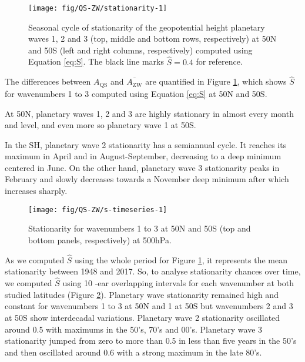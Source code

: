 \documentclass[draft,linenumbers]{agujournal2018}
\begin{document}
\begin{figure}[h]

{\centering \texttt{[image: fig/QS-ZW/stationarity-1]} 

}

\caption{Seasonal cycle of stationarity of the geopotential height planetary waves 1, 2 and 3 (top, middle and bottom rows, respectively) at 50\degree N and 50\degree S (left and right columns, respectively) computed using Equation \ref{eq:S}. The black line marks $\hat{S} = 0.4$ for reference.}\label{fig:stationarity}
\end{figure}

The differences between \(A_\mathrm{QS}\) and
\(\overline{A_\mathrm{ZW}}\) are quantified in Figure
\ref{fig:stationarity}, which shows \(\hat{S}\) for wavenumbers 1 to 3
computed using Equation \ref{eq:S} at 50\degree N and 50\degree S.

At 50\degree N, planetary waves 1, 2 and 3 are highly stationary in
almost every month and level, and even more so planetary wave 1 at
50\degree S.

In the SH, planetary wave 2 stationarity has a semiannual cycle. It
reaches its maximum in April and in August-September, decreasing to a
deep minimum centered in June. On the other hand, planetary wave 3
stationarity peaks in February and slowly decreases towards a November
deep minimum after which increases sharply.

\begin{figure}[h]

{\centering \texttt{[image: fig/QS-ZW/s-timeseries-1]} 

}

\caption{Stationarity for wavenumbers 1 to 3 at 50\degree N and  50\degree S (top and bottom panels, respectively) at 500hPa.}\label{fig:s-timeseries}
\end{figure}

As we computed \(\hat{S}\) using the whole period for Figure
\ref{fig:stationarity}, it represents the mean stationarity between 1948
and 2017. So, to analyse stationarity chances over time, we computed
\(\hat{S}\) using 10 -ear overlapping intervals for each wavenumber at
both studied latitudes (Figure \ref{fig:s-timeseries}). Planetary wave
stationarity remained high and constant for wavenumbers 1 to 3 at
50\degree N and 1 at 50\degree S but wavenumbers 2 and 3 at 50\degree S
show interdecadal variations. Planetary wave 2 stationarity oscillated
around 0.5 with maximums in the 50's, 70's and 00's. Planetary wave 3
stationarity jumped from zero to more than 0.5 in less than five years
in the 50's and then oscillated around 0.6 with a strong maximum in the
late 80's.
\end{document}
